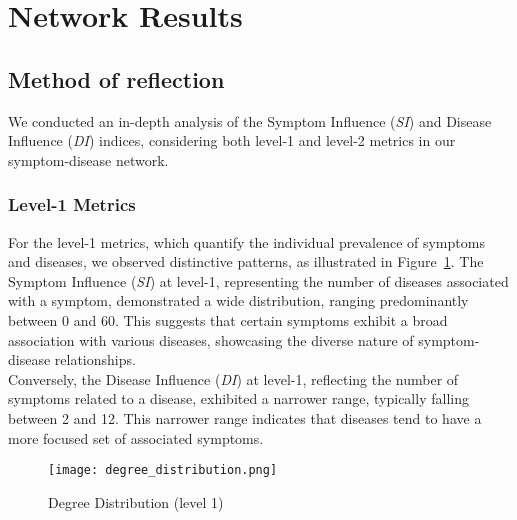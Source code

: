 \section{Network Results}
\subsection{Method of reflection}

We conducted an in-depth analysis of the Symptom Influence (\textit{SI}) and Disease Influence (\textit{DI}) indices,
considering both level-1 and level-2 metrics in our symptom-disease network.

\subsubsection*{Level-1 Metrics}


For the level-1 metrics, which quantify the individual prevalence of symptoms and diseases,
we observed distinctive patterns, as illustrated in Figure~\ref{fig:DegreeDistribution}.
The Symptom Influence (\textit{SI}) at level-1, representing the number of diseases associated with a symptom, demonstrated a wide distribution,
ranging predominantly between 0 and 60. This suggests that certain symptoms exhibit a broad association with various diseases,
showcasing the diverse nature of symptom-disease relationships.\\
Conversely, the Disease Influence (\textit{DI}) at level-1, reflecting the number of symptoms related to a disease,
exhibited a narrower range, typically falling between 2 and 12.
This narrower range indicates that diseases tend to have a more focused set of associated symptoms.
\begin{figure}[H]
    \centering
    \texttt{[image: degree\_distribution.png]}
    \caption{Degree Distribution (level 1)}
    \label{fig:DegreeDistribution}
\end{figure}

